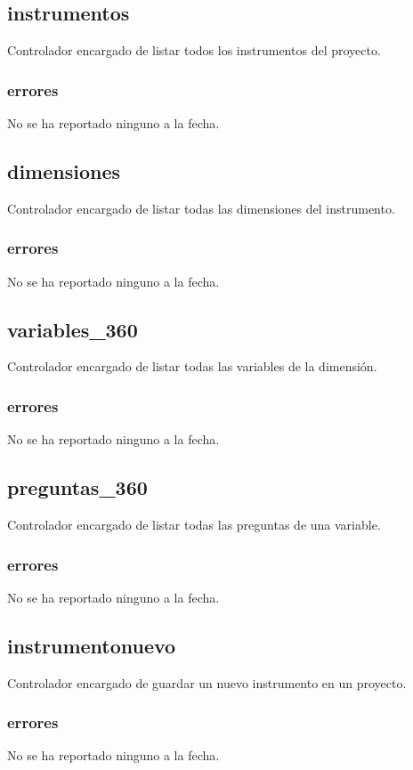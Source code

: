 \documentclass[10pt,a4paper]{book}
\begin{document}
	\subsection{instrumentos}
	Controlador encargado de listar todos los instrumentos del proyecto.
	\subsubsection{errores}
	No se ha reportado ninguno a la fecha.
	
	\subsection{dimensiones}
	Controlador encargado de listar todas las dimensiones del instrumento.
	\subsubsection{errores}
	No se ha reportado ninguno a la fecha.
	
	\subsection{variables\_360}
	Controlador encargado de listar todas las variables de la dimensión.
	\subsubsection{errores}
	No se ha reportado ninguno a la fecha.
	
	\subsection{preguntas\_360}
	Controlador encargado de listar todas las preguntas de una variable.
	\subsubsection{errores}
	No se ha reportado ninguno a la fecha.
	
	\subsection{instrumentonuevo}
	Controlador encargado de guardar un nuevo instrumento en un proyecto.
	\subsubsection{errores}
	No se ha reportado ninguno a la fecha.
	
\end{document}
